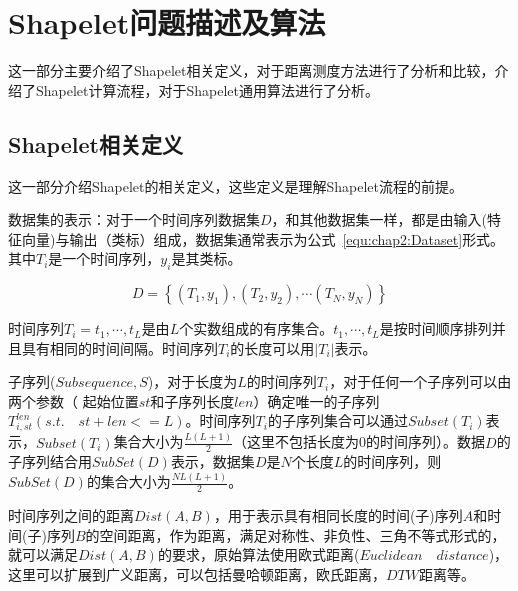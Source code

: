 \chapter{Shapelet问题描述及算法}
\label{cha:chap02}
这一部分主要介绍了Shapelet相关定义，对于距离测度方法进行了分析和比较，介绍了Shapelet计算流程，对于Shapelet通用算法进行了分析。
\section{Shapelet相关定义}
\label{cha:chap02:def}
这一部分介绍Shapelet的相关定义\cite{ye2009time}，这些定义是理解Shapelet流程的前提。

\begin{definition}
	数据集的表示：对于一个时间序列数据集$D$，和其他数据集一样，都是由输入(特征向量)与输出（类标）组成，数据集通常表示为公式~\ref{equ:chap2:Dataset}形式。其中$T_i$是一个时间序列，$y_i$是其类标。
\end{definition}
\begin{equation}
\label{equ:chap2:Dataset}
D = \left\lbrace (T_1,y_1),(T_2,y_2),\cdots (T_N,y_N)\right\rbrace 
\end{equation}

\begin{definition}
	时间序列$T_i=t_1,\cdots,t_L$是由$L$个实数组成的有序集合。$t_1,\cdots,t_L$是按时间顺序排列并且具有相同的时间间隔。时间序列$T_i$的长度可以用$|T_i|$表示。
\end{definition}

\begin{definition}
\label{def:chap02:Subsequence}
	子序列($Subsequence,S$)，对于长度为$L$的时间序列$T_i$，对于任何一个子序列可以由两个参数（ 起始位置$st$和子序列长度$len$）确定唯一的子序列$T_{i,st}^{len}(s.t.\quad st+len <= L)$。时间序列$T_i$的子序列集合可以通过$Subset(T_i)$表示，$Subset(T_i)$集合大小为$\frac{L(L+1)}{2}$（这里不包括长度为0的时间序列）。数据$D$的子序列结合用$SubSet(D)$表示，数据集$D$是$N$个长度$L$的时间序列，则$SubSet(D)$的集合大小为$\frac{NL(L+1)}{2}$。

\end{definition}

\begin{definition}
	时间序列之间的距离$Dist(A,B)$，用于表示具有相同长度的时间(子)序列$A$和时间(子)序列$B$的空间距离，作为距离，满足对称性、非负性、三角不等式形式的，就可以满足$Dist(A,B)$的要求，原始算法使用欧式距离($Euclidean\quad distance$)，这里可以扩展到广义距离，可以包括曼哈顿距离，欧氏距离，$DTW$距离等。
\end{definition}


